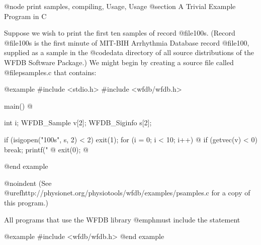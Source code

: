 @node     print samples, compiling, Usage, Usage
@section A Trivial Example Program in C

Suppose we wish to print the first ten samples of record @file{100s}.
(Record @file{100s} is the first minute of MIT-BIH Arrhythmia Database
record @file{100}, supplied as a sample in the @code{data} directory of all
source distributions of the WFDB Software Package.)  We might begin by
creating a source file called @file{psamples.c} that contains:

@example
#include <stdio.h>
#include <wfdb/wfdb.h>

main()
@{
    int i;
    WFDB_Sample v[2];
    WFDB_Siginfo s[2];

    if (isigopen("100s", s, 2) < 2)
        exit(1);
    for (i = 0; i < 10; i++) @{
        if (getvec(v) < 0)
            break;
        printf("%
    @}
    exit(0);
@}
@end example

@noindent
(See @uref{http://physionet.org/physiotools/wfdb/examples/psamples.c}
for a copy of this program.)

All programs that use the WFDB library @emph{must} include the
statement

@example
#include <wfdb/wfdb.h>
@end example

